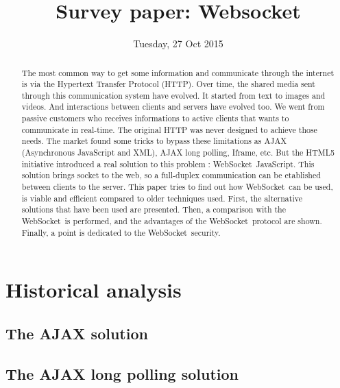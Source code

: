 \documentclass[journal,compsoc]{IEEEtran}
\newcommand{\ws}{WebSocket~}
\begin{document}
\author{}

\title{Survey paper: Websocket}

\date{Tuesday, 27 Oct 2015}

\maketitle
\IEEEpeerreviewmaketitle



\begin{abstract}
The most common way to get some information and communicate through the internet is via the Hypertext Transfer Protocol (HTTP).
Over time, the shared media sent through this communication system have evolved.
It started from text to images and videos.
And interactions between clients and servers have evolved too.
We went from passive customers who receives informations to active clients that wants to communicate in real-time.
The original HTTP was never designed to achieve those needs.
The market found some tricks to bypass these limitations as AJAX (Asynchronous JavaScript and XML), AJAX long polling, Iframe, etc.
But the HTML5 initiative introduced a real solution to this problem : \ws JavaScript.
This solution brings socket to the web, so a full-duplex communication can be etablished between clients to the server.
This paper tries to find out how \ws can be used, is viable and efficient compared to older techniques used. 
First, the alternative solutions that have been used are presented.
Then, a comparison with the \ws is performed, and the advantages of the \ws protocol are shown.
Finally, a point is dedicated to the \ws security.
\end{abstract}


\section{Historical analysis}



  \cite{http-rfc}

\subsection{The AJAX solution}

\subsection{The AJAX long polling solution}
\end{document}
